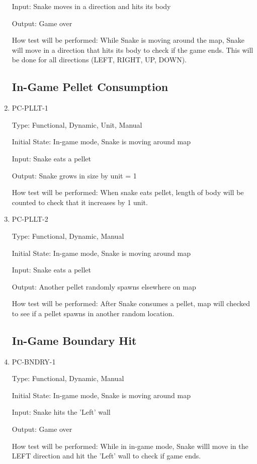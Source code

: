 \documentclass[12pt, titlepage]{article}
\begin{document}
\begin{enumerate}
Input: Snake moves in a direction and hits its body

Output: Game over

How test will be performed: While Snake is moving around the map, Snake will move in a direction that hits its body to check if the game ends. This will be done for all directions (LEFT, RIGHT, UP, DOWN).


\subsection{In-Game Pellet Consumption}

\item{PC-PLLT-1}
\label{pc-pllt-1}

Type: Functional, Dynamic, Unit, Manual

Initial State: In-game mode, Snake is moving around map

Input: Snake eats a pellet

Output: Snake grows in size by unit = 1

How test will be performed: When snake eats pellet, length of body will be counted to check that it increases by 1 unit.

\item{PC-PLLT-2}
\label{pc-pllt-2}

Type: Functional, Dynamic, 
Manual

Initial State: In-game mode, Snake is moving around map

Input: Snake eats a pellet

Output: Another pellet randomly spawns elsewhere on map

How test will be performed: After Snake consumes a pellet, map will checked to see if a pellet spawns in another random location.


\subsection{In-Game Boundary Hit}
\label{gameover}

\item{PC-BNDRY-1}
\label{pc-bndry-1}

Type: Functional, Dynamic, Manual

Initial State: In-game mode, Snake is moving around map

Input: Snake hits the 'Left' wall

Output: Game over

How test will be performed: While in in-game mode, Snake willl move in the LEFT direction and hit the 'Left' wall to check if game ends.


\end{enumerate}
\end{document}
